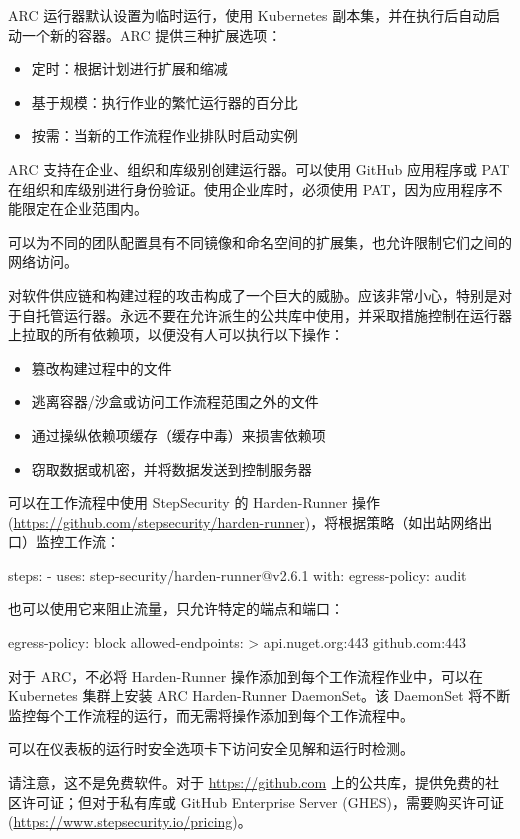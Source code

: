 
ARC 运行器默认设置为临时运行，使用 Kubernetes 副本集，并在执行后自动启动一个新的容器。ARC 提供三种扩展选项：

\begin{itemize}
\item 
定时：根据计划进行扩展和缩减

\item 
基于规模：执行作业的繁忙运行器的百分比

\item 
按需：当新的工作流程作业排队时启动实例
\end{itemize}

ARC 支持在企业、组织和库级别创建运行器。可以使用 GitHub 应用程序或 PAT 在组织和库级别进行身份验证。使用企业库时，必须使用 PAT，因为应用程序不能限定在企业范围内。

可以为不同的团队配置具有不同镜像和命名空间的扩展集，也允许限制它们之间的网络访问。


对软件供应链和构建过程的攻击构成了一个巨大的威胁。应该非常小心，特别是对于自托管运行器。永远不要在允许派生的公共库中使用，并采取措施控制在运行器上拉取的所有依赖项，以便没有人可以执行以下操作：

\begin{itemize}
\item 
篡改构建过程中的文件

\item 
逃离容器/沙盒或访问工作流程范围之外的文件

\item 
通过操纵依赖项缓存（缓存中毒）来损害依赖项

\item 
窃取数据或机密，并将数据发送到控制服务器
\end{itemize}

可以在工作流程中使用 StepSecurity 的 Harden-Runner 操作(\url{https://github.com/stepsecurity/harden-runner})，将根据策略（如出站网络出口）监控工作流：

\begin{shell}
steps:
  - uses: step-security/harden-runner@v2.6.1
    with:
      egress-policy: audit
\end{shell}

也可以使用它来阻止流量，只允许特定的端点和端口：

\begin{shell}
egress-policy: block
allowed-endpoints: >
  api.nuget.org:443
  github.com:443
\end{shell}

对于 ARC，不必将 Harden-Runner 操作添加到每个工作流程作业中，可以在 Kubernetes 集群上安装 ARC Harden-Runner DaemonSet。该 DaemonSet 将不断监控每个工作流程的运行，而无需将操作添加到每个工作流程中。

可以在仪表板的运行时安全选项卡下访问安全见解和运行时检测。

请注意，这不是免费软件。对于 \url{https://github.com} 上的公共库，提供免费的社区许可证；但对于私有库或 GitHub Enterprise Server (GHES)，需要购买许可证(\url{https://www.stepsecurity.io/pricing})。



